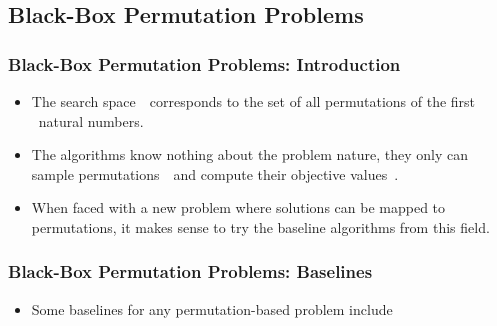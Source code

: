 \documentclass[aspectratio=169,mathserif,notheorems]{beamer}%
\begin{document}
\subsection{Black-Box Permutation Problems}%
%
\begin{frame}%
\frametitle{Black-Box Permutation Problems: Introduction}%
\begin{itemize}%
\item The search space~\searchSpace\ corresponds to the set of all permutations of the first \scale~natural numbers.%
%
\item<2-> The algorithms know nothing about the problem nature, they only can sample permutations~\sespel\ and compute their objective values~\objFunb{\sespel}.%
%
\item<3-> When faced with a new problem where solutions can be mapped to permutations, it makes sense to try the baseline algorithms from this field.%
%
\end{itemize}%
\end{frame}%
%
\begin{frame}%
\frametitle{Black-Box Permutation Problems: Baselines}%
\begin{itemize}%
\item Some baselines for any permutation-based problem include%
\end{itemize}%
\end{frame}%
%
%
\end{document}
